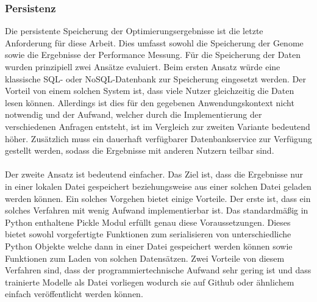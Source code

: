 \subsubsection{Persistenz}
Die persistente Speicherung der Optimierungsergebnisse ist die letzte Anforderung für diese Arbeit. Dies umfasst sowohl die Speicherung der Genome sowie die Ergebnisse der Performance Messung. Für die Speicherung der Daten wurden prinzipiell zwei Ansätze evaluiert. Beim ersten Ansatz würde eine klassische SQL- oder NoSQL-Datenbank zur Speicherung eingesetzt werden. Der Vorteil von einem solchen System ist, dass viele Nutzer gleichzeitig die Daten lesen können. Allerdings ist dies für den gegebenen Anwendungskontext nicht notwendig und der Aufwand, welcher durch die Implementierung der verschiedenen Anfragen entsteht, ist im Vergleich zur zweiten Variante bedeutend höher. Zusätzlich muss ein dauerhaft verfügbarer Datenbankservice zur Verfügung gestellt werden, sodass die Ergebnisse mit anderen Nutzern teilbar sind.
\\\\
Der zweite Ansatz ist bedeutend einfacher. Das Ziel ist, dass die Ergebnisse nur in einer lokalen Datei gespeichert beziehungsweise aus einer solchen Datei geladen werden können. Ein solches Vorgehen bietet einige Vorteile. Der erste ist, dass ein solches Verfahren mit wenig Aufwand implementierbar ist. Das standardmäßig in Python enthaltene Pickle Modul erfüllt genau diese Voraussetzungen. Dieses bietet sowohl vorgefertigte Funktionen zum serialisieren von unterschiedliche Python Objekte welche dann in einer Datei gespeichert werden können sowie Funktionen zum Laden von solchen Datensätzen. Zwei Vorteile von diesem Verfahren sind, dass der programmiertechnische Aufwand sehr gering ist und dass trainierte Modelle als Datei vorliegen wodurch sie auf Github oder ähnlichem einfach veröffentlicht werden können.
\\\\
